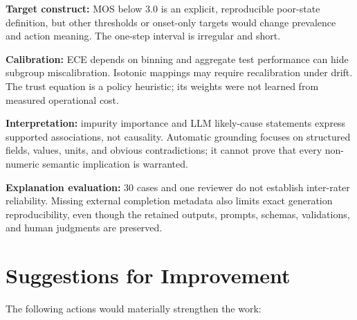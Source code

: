 \documentclass[10pt,conference]{IEEEtran}
\begin{document}
\textbf{Target construct:} MOS below 3.0 is an explicit, reproducible poor-state
definition, but other thresholds or onset-only targets would change prevalence
and action meaning.  The one-step interval is irregular and short.

\textbf{Calibration:} ECE depends on binning and aggregate test performance can
hide subgroup miscalibration.  Isotonic mappings may require recalibration
under drift.  The trust equation is a policy heuristic; its weights were not
learned from measured operational cost.

\textbf{Interpretation:} impurity importance and LLM likely-cause statements
express supported associations, not causality.  Automatic grounding focuses on
structured fields, values, units, and obvious contradictions; it cannot prove
that every non-numeric semantic implication is warranted.

\textbf{Explanation evaluation:} 30 cases and one reviewer do not establish
inter-rater reliability.  Missing external completion metadata also limits
exact generation reproducibility, even though the retained outputs, prompts,
schemas, validations, and human judgments are preserved.

\section{Suggestions for Improvement}

The following actions would materially strengthen the work:
\end{document}
